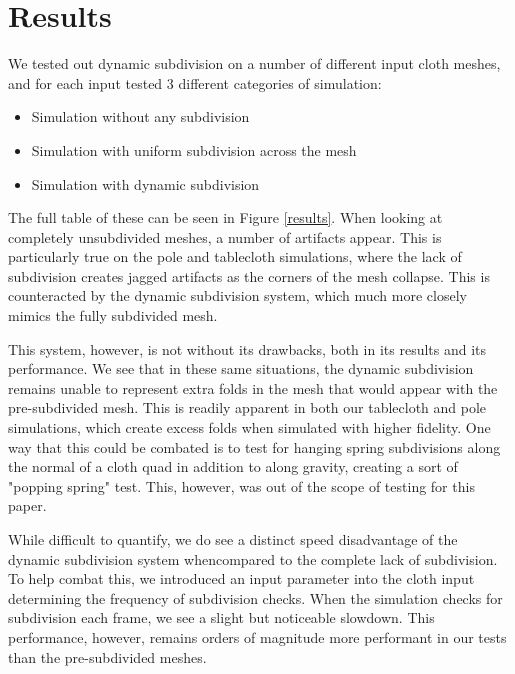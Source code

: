 \documentclass[sigconf]{acmart}
\begin{document}
\section{Results}
We tested out dynamic subdivision on a number of different input cloth meshes, and for each input tested 3 different categories of simulation:
\begin{itemize}
\item Simulation without any subdivision
\item Simulation with uniform subdivision across the mesh
\item Simulation with dynamic subdivision
\end{itemize}
The full table of these can be seen in Figure \ref{results}. When looking at completely unsubdivided meshes, a number of artifacts appear. This is particularly true on the pole and tablecloth simulations, where the lack of subdivision creates jagged artifacts as the corners of the mesh collapse. This is counteracted by the dynamic subdivision system, which much more closely mimics the fully subdivided mesh. 

This system, however, is not without its drawbacks, both in its results and its performance. We see that in these same situations, the dynamic subdivision remains unable to represent extra folds in the mesh that would appear with the pre-subdivided mesh. This is readily apparent in both our tablecloth and pole simulations, which create excess folds when simulated with higher fidelity. One way that this could be combated is to test for hanging spring subdivisions along the normal of a cloth quad in addition to along gravity, creating a sort of "popping spring" test. This, however, was out of the scope of testing for this paper.

While difficult to quantify, we do see a distinct speed disadvantage of the dynamic subdivision system whencompared to the complete lack of subdivision. To help combat this, we introduced an input parameter into the cloth input determining the frequency of subdivision checks. When the simulation checks for subdivision each frame, we see a slight but noticeable slowdown. This performance, however, remains orders of magnitude more performant in our tests than the pre-subdivided meshes.
\end{document}
